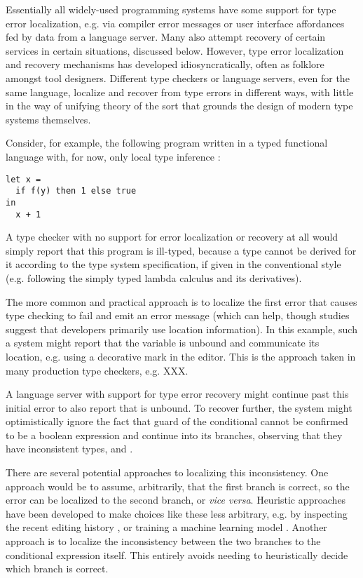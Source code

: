 Essentially all widely-used programming systems have some support for type error 
localization, e.g. via compiler error messages or user interface affordances fed by data from a language server.
Many also attempt recovery of certain services in certain situations, discussed below. 
However, type error localization and recovery mechanisms has developed idiosyncratically, often as folklore amongst tool designers. Different type checkers or language servers, even for the same language, localize and recover from type errors in different ways, with little in the way of unifying theory of the sort that grounds the design of modern type systems themselves.

Consider, for example, the following program written in a typed functional language with, for now, only local type inference \cite{pierce}: 
\begin{lstlisting}[numbers=none]
let x = 
  if f(y) then 1 else true
in 
  x + 1
\end{lstlisting}
A type checker with no support for error localization or recovery at all would simply report that this program is ill-typed, because a type cannot be derived for it according to the type system specification, if given in the conventional style (e.g. following the simply typed lambda calculus and its derivatives). 

The more common and practical approach is to localize the first error that causes type checking to fail and emit an error message (which can help, though studies suggest that developers primarily use location information). In this example, such a system might report that the variable  is unbound and communicate its location, e.g. using a decorative mark in the editor. 
This is the approach taken in many production type checkers, e.g. XXX.

A language server with support for type error recovery might continue past this initial error to also report that  is unbound. To recover further, the system might optimistically ignore the fact that guard of the conditional cannot be confirmed to be a boolean expression and continue into its branches, observing that they have inconsistent types,  and . 

There are several potential approaches to localizing this inconsistency. 
One approach would be to assume, arbitrarily, that the first branch is correct, so the error can be localized to the second branch, or \emph{vice versa}. 
Heuristic approaches have been developed to make choices like these less arbitrary, e.g. by inspecting the recent editing history , or training a machine learning model . 
Another approach is to localize the inconsistency between the two branches to the conditional expression itself. This entirely avoids needing to heuristically decide which branch is correct. 

